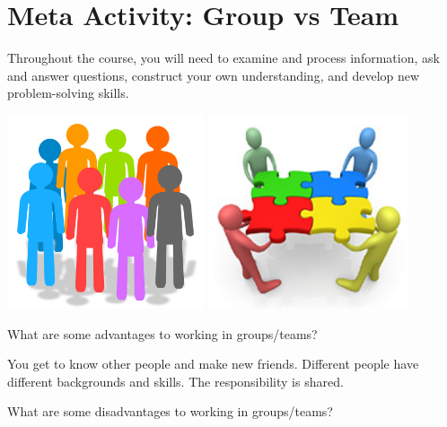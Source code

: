 \section*{Meta Activity: Group vs Team}

Throughout the course, you will need to examine and process information, ask and answer questions, construct your own understanding, and develop new problem-solving skills.

\begin{center}
\includegraphics[height=2.25in]{group1.png}
\hspace{0.5in}
\includegraphics[height=2.25in]{group2.jpg}
\end{center}




\Q What are some advantages to working in groups/teams?

\begin{answer}
You get to know other people and make new friends.
Different people have different backgrounds and skills.
The responsibility is shared.
\end{answer}


\Q What are some disadvantages to working in groups/teams?


